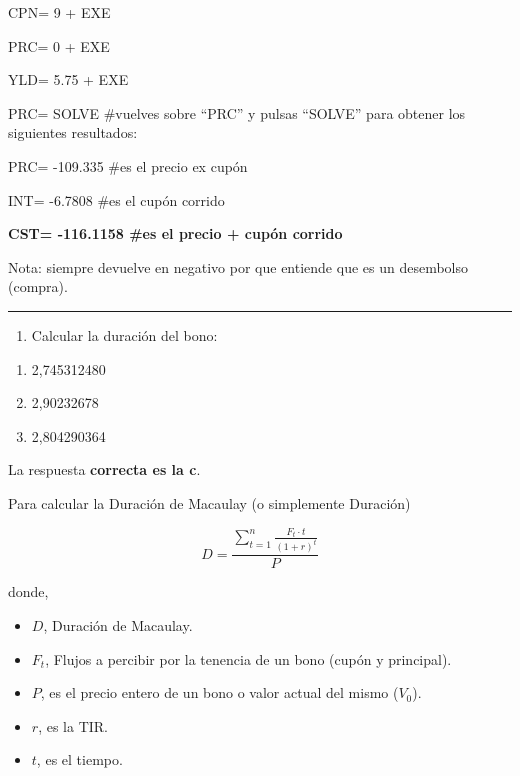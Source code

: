 \documentclass[
  letterpaper,
  DIV=11,
  numbers=noendperiod]{scrreprt}
\providecommand{\tightlist}{%
  \setlength{\itemsep}{0pt}\setlength{\parskip}{0pt}}\usepackage{longtable,booktabs,array}
\begin{document}
\begin{tcolorbox}
\begin{tcolorbox}
CPN= 9 + EXE

PRC= 0 + EXE

YLD= 5.75 + EXE

PRC= SOLVE \#vuelves sobre ``PRC'' y pulsas ``SOLVE'' para obtener los
siguientes resultados:

PRC= -109.335 \#es el precio ex cupón

INT= -6.7808 \#es el cupón corrido

\textbf{CST= -116.1158 \#es el precio + cupón corrido}

Nota: siempre devuelve en negativo por que entiende que es un desembolso
(compra).

\end{tcolorbox}

\begin{center}\rule{0.5\linewidth}{0.5pt}\end{center}

\begin{enumerate}
\def\labelenumi{\arabic{enumi}.}
\setcounter{enumi}{1}
\tightlist
\item
  Calcular la duración del bono:
\end{enumerate}

\begin{enumerate}
\def\labelenumi{\alph{enumi}.}
\item
  2,745312480
\item
  2,90232678
\item
  2,804290364
\end{enumerate}

\begin{tcolorbox}[enhanced jigsaw, toprule=.15mm, left=2mm, breakable, opacitybacktitle=0.6, toptitle=1mm, coltitle=black, arc=.35mm, leftrule=.75mm, bottomtitle=1mm, titlerule=0mm, title=\textcolor{quarto-callout-tip-color}{\faLightbulb}\hspace{0.5em}{Solución}, rightrule=.15mm, opacityback=0, bottomrule=.15mm, colback=white, colframe=quarto-callout-tip-color-frame, colbacktitle=quarto-callout-tip-color!10!white]

La respuesta \textbf{correcta es la c}.

Para calcular la Duración de Macaulay (o simplemente Duración)

\[D=\frac{\sum_{t=1}^{n}\frac{F_t\cdot t}{\left(1+r\right)^t}}{P}\]

donde,

\begin{itemize}
\item
  \(D\), Duración de Macaulay.
\item
  \(F_t\), Flujos a percibir por la tenencia de un bono (cupón y
  principal).
\item
  \(P\), es el precio entero de un bono o valor actual del mismo
  (\(V_0\)).
\item
  \(r\), es la TIR.
\item
  \(t\), es el tiempo.
\end{itemize}


\end{tcolorbox}
\end{tcolorbox}
\end{document}
